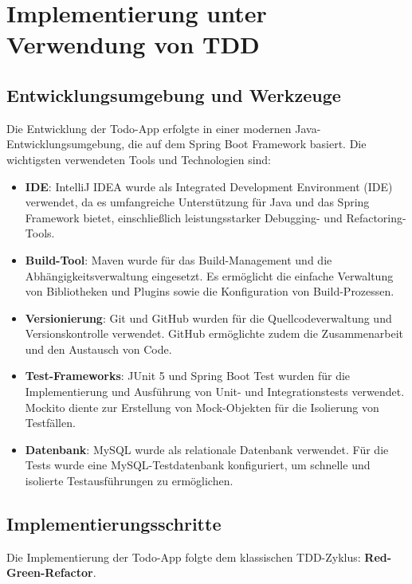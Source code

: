 \chapter{Implementierung unter Verwendung von TDD}

\section{Entwicklungsumgebung und Werkzeuge}

Die Entwicklung der Todo-App erfolgte in einer modernen Java-Entwicklungsumgebung, die auf dem Spring Boot Framework basiert. Die wichtigsten verwendeten Tools und Technologien sind:

\begin{itemize}
	\item \textbf{IDE}: IntelliJ IDEA wurde als Integrated Development Environment (IDE) verwendet, da es umfangreiche Unterstützung für Java und das Spring Framework bietet, einschließlich leistungsstarker Debugging- und Refactoring-Tools.
	\item \textbf{Build-Tool}: Maven wurde für das Build-Management und die Abhängigkeitsverwaltung eingesetzt. Es ermöglicht die einfache Verwaltung von Bibliotheken und Plugins sowie die Konfiguration von Build-Prozessen.
	\item \textbf{Versionierung}: Git und GitHub wurden für die Quellcodeverwaltung und Versionskontrolle verwendet. GitHub ermöglichte zudem die Zusammenarbeit und den Austausch von Code.
	\item \textbf{Test-Frameworks}: JUnit 5 und Spring Boot Test wurden für die Implementierung und Ausführung von Unit- und Integrationstests verwendet. Mockito diente zur Erstellung von Mock-Objekten für die Isolierung von Testfällen.
	\item \textbf{Datenbank}: MySQL wurde als relationale Datenbank verwendet. Für die Tests wurde eine MySQL-Testdatenbank konfiguriert, um schnelle und isolierte Testausführungen zu ermöglichen.
\end{itemize}

\section{Implementierungsschritte}

Die Implementierung der Todo-App folgte dem klassischen TDD-Zyklus: \textbf{Red-Green-Refactor}.

